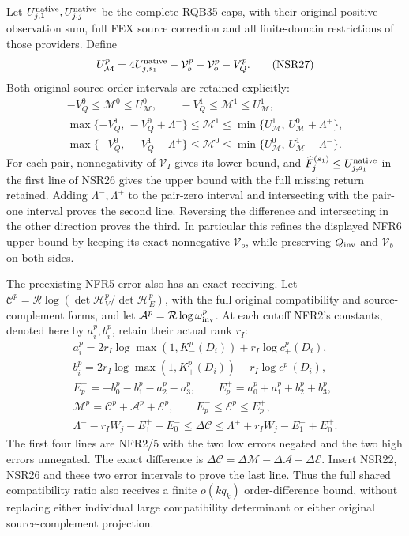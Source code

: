 \documentclass[11pt,a4paper]{article}
\begin{document}
Let $U_{j,1}^{\rm native},U_{j,j}^{\rm native}$ be the
complete RQB35 caps, with their original positive
observation sum, full FEX source correction and all
finite-domain restrictions of those providers. Define
\[
 U_{\mathcal M}^p
    =4U_{j,s_1}^{\rm native}-\mathcal V_b^p-\mathcal V_o^p-V_Q^p .
 \tag{NSR27}
\]
Both original source-order intervals are retained explicitly:
\[
 \begin{gathered}
 -V_Q^0\le\mathcal M^0\le U_{\mathcal M}^0,\qquad
 -V_Q^1\le\mathcal M^1\le U_{\mathcal M}^1,\\
 \max\{-V_Q^1,\,-V_Q^0+\Lambda^-\}
       \le\mathcal M^1
       \le\min\{U_{\mathcal M}^1,\,U_{\mathcal M}^0+\Lambda^+\},\\
 \max\{-V_Q^0,\,-V_Q^1-\Lambda^+\}
       \le\mathcal M^0
       \le\min\{U_{\mathcal M}^0,\,U_{\mathcal M}^1-\Lambda^-\}.
 \end{gathered}\tag{NSR28}
\]
For each pair, nonnegativity of $\mathcal V_I$ gives its
lower bound, and $\widehat F_j^{(s_1)}\le U_{j,s_1}^{\rm native}$
in the first line of NSR26 gives the upper bound with the
full missing return retained. Adding $\Lambda^-,\Lambda^+$
to the pair-zero interval and intersecting with the pair-one
interval proves the second line. Reversing the difference
and intersecting in the other direction proves the third.
In particular this refines the displayed NFR6 upper bound
by keeping its exact nonnegative $\mathcal V_o$, while
preserving $Q_{\rm inv}$ and $\mathcal V_b$ on both sides.

The preexisting NFR5 error also has an exact receiving.
Let $\mathcal C^p=\mathcal R\log
(\det\mathcal H_V^p/\det\mathcal H_E^p)$, with the full
original compatibility and source-complement forms, and
let $\mathcal A^p=\mathcal R\log\omega_{\rm inv}^p$.
At each cutoff NFR2's constants, denoted here by
$a_i^p,b_i^p$, retain their actual rank $r_I$:
\[
 \begin{gathered}
 a_i^p=2r_I\log\max(1,K_-^p(D_i))+r_I\log c_+^p(D_i),\\
 b_i^p=2r_I\log\max(1,K_+^p(D_i))-r_I\log c_-^p(D_i),\\
 E_p^-=-b_0^p-b_1^p-a_2^p-a_3^p,\qquad
 E_p^+=a_0^p+a_1^p+b_2^p+b_3^p,\\
 \mathcal M^p=\mathcal C^p+\mathcal A^p+\mathcal E^p,\qquad
 E_p^-\le\mathcal E^p\le E_p^+,\\
 \Lambda^- -r_IW_j-E_1^++E_0^-
    \le\Delta\mathcal C
    \le\Lambda^+ +r_IW_j-E_1^-+E_0^+ .
 \end{gathered}\tag{NSR29}
\]
The first four lines are NFR2/5 with the two low errors
negated and the two high errors unnegated.
The exact difference is
$\Delta\mathcal C=\Delta\mathcal M-\Delta\mathcal A-
\Delta\mathcal E$.
Insert NSR22, NSR26 and these two error intervals to prove
the last line. Thus the full shared compatibility ratio
also receives a finite $o(kq_k)$ order-difference bound,
without replacing either individual large compatibility
determinant or either original source-complement projection.
\end{document}

